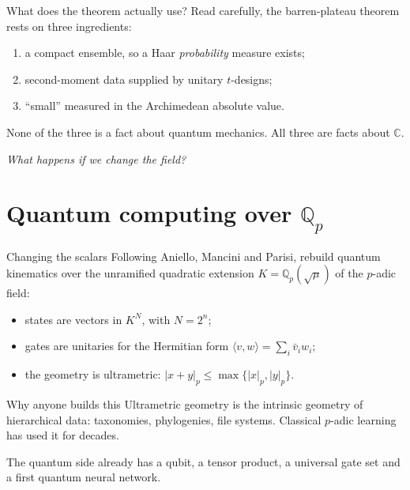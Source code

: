\documentclass[aspectratio=169,compress]{beamer}
\newcommand{\Qp}{\mathbb{Q}_p}
\newcommand{\padicnorm}[1]{\left|#1\right|_p}
\newcommand{\inner}[2]{\langle #1, #2\rangle}
\begin{document}
\begin{frame}{What does the theorem actually use?}
  Read carefully, the barren-plateau theorem rests on three ingredients:
  \vspace{0.4em}
  \begin{enumerate}
    \item a \alert{compact} ensemble, so a Haar \emph{probability} measure
      exists;
    \item second-moment data supplied by unitary \alert{$t$-designs};
    \item ``small'' measured in the \alert{Archimedean} absolute value.
  \end{enumerate}
  \vspace{0.8em}
  None of the three is a fact about quantum mechanics.
  All three are facts about $\mathbb{C}$.
  \vspace{0.8em}
  \begin{center}
    \Large\emph{What happens if we change the field?}
  \end{center}
\end{frame}

\section[Over $\Qp$]{Quantum computing over $\Qp$}

\begin{frame}{Changing the scalars}
  Following Aniello, Mancini and Parisi, rebuild quantum kinematics over the
  unramified quadratic extension $K=\Qp(\sqrt\mu)$ of the $p$-adic field:
  \begin{itemize}
    \item states are vectors in $K^{N}$, with $N=2^{n}$;
    \item gates are unitaries for the Hermitian form
      $\inner vw=\sum_i\bar v_iw_i$;
    \item the geometry is \alert{ultrametric}:
      $\padicnorm{x+y}\le\max\{\padicnorm{x},\padicnorm{y}\}$.
  \end{itemize}
  \begin{block}{Why anyone builds this}
    Ultrametric geometry is the intrinsic geometry of \alert{hierarchical
    data}: taxonomies, phylogenies, file systems. Classical $p$-adic learning
    has used it for decades.
  \end{block}
  The quantum side already has a qubit, a tensor product, a universal gate set
  and a first quantum neural network.
\end{frame}
\end{document}

